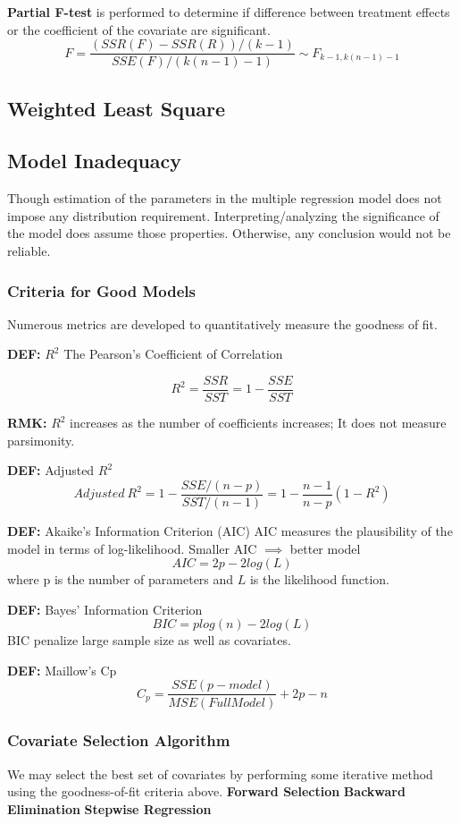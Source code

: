 \documentclass[9pt]{article}
\newcommand{\de}{\textbf{DEF: }}
\newcommand{\rmk}{\textbf{RMK: }}
\begin{document}
\textbf{Partial F-test} is performed to determine if difference between treatment effects or the coefficient of the covariate are significant.
$$
    F = \frac{(SSR(F)-SSR(R))/(k-1)}{SSE(F)/(k(n-1)-1)} \sim F_{k-1, k(n-1)-1}
$$
\subsection{Weighted Least Square}


\subsection{Model Inadequacy}
Though estimation of the parameters in the multiple regression model does not impose any distribution requirement. Interpreting/analyzing the significance of the model does assume those properties. Otherwise, any conclusion would not be reliable.

\subsubsection{Criteria for Good Models}
Numerous metrics are developed to quantitatively measure the goodness of fit.

\de $R^2$ The Pearson's Coefficient of Correlation

$$
R^2 = \frac{SSR}{SST} = 1 - \frac{SSE}{SST}
$$

\rmk $R^2$ increases as the number of coefficients increases; It does not measure parsimonity.

\de Adjusted $R^2$
$$
    Adjusted\ R^2 = 1 - \frac{SSE/(n-p)}{SST/(n-1)} = 1 - \frac{n-1}{n-p}(1-R^2)
$$

\de Akaike's Information Criterion (AIC)
AIC measures the plausibility of the model in terms of log-likelihood. Smaller AIC $\implies$ better model
$$
    AIC = 2p - 2log(L)
$$
where p is the number of parameters and $L$ is the likelihood function.

\de Bayes' Information Criterion
$$
BIC = plog(n) - 2log(L)
$$
BIC penalize large sample size as well as covariates. 

\de Maillow's Cp
$$
C_p = \frac{SSE(p-model)}{MSE(Full Model)} + 2p -n
$$

\subsubsection{Covariate Selection Algorithm}
We may select the best set of covariates by performing some iterative method using the goodness-of-fit criteria above.
\textbf{Forward Selection}
\textbf{Backward Elimination}
\textbf{Stepwise Regression}
\end{document}
